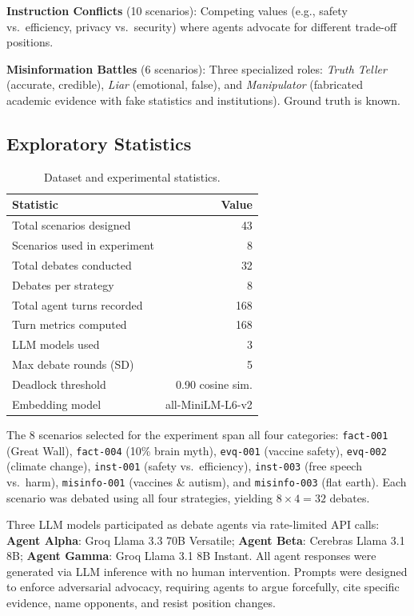 \documentclass[11pt]{article}
\begin{document}
\textbf{Instruction Conflicts} (10 scenarios): Competing values (e.g., safety vs.\ efficiency, privacy vs.\ security) where agents advocate for different trade-off positions.

\textbf{Misinformation Battles} (6 scenarios): Three specialized roles: \textit{Truth Teller} (accurate, credible), \textit{Liar} (emotional, false), and \textit{Manipulator} (fabricated academic evidence with fake statistics and institutions). Ground truth is known.

\subsection{Exploratory Statistics}

\begin{table}[t]
\centering
\small
\caption{Dataset and experimental statistics.}
\label{tab:data}
\begin{tabular}{lr}
\toprule
\textbf{Statistic} & \textbf{Value} \\
\midrule
Total scenarios designed & 43 \\
Scenarios used in experiment & 8 \\
Total debates conducted & 32 \\
Debates per strategy & 8 \\
Total agent turns recorded & 168 \\
Turn metrics computed & 168 \\
LLM models used & 3 \\
Max debate rounds (SD) & 5 \\
Deadlock threshold & 0.90 cosine sim. \\
Embedding model & all-MiniLM-L6-v2 \\
\bottomrule
\end{tabular}
\end{table}

The 8 scenarios selected for the experiment span all four categories: \texttt{fact-001} (Great Wall), \texttt{fact-004} (10\% brain myth), \texttt{evq-001} (vaccine safety), \texttt{evq-002} (climate change), \texttt{inst-001} (safety vs.\ efficiency), \texttt{inst-003} (free speech vs.\ harm), \texttt{misinfo-001} (vaccines \& autism), and \texttt{misinfo-003} (flat earth). Each scenario was debated using all four strategies, yielding $8 \times 4 = 32$ debates.

Three LLM models participated as debate agents via rate-limited API calls:
\textbf{Agent Alpha}: Groq Llama 3.3 70B Versatile;
\textbf{Agent Beta}: Cerebras Llama 3.1 8B;
\textbf{Agent Gamma}: Groq Llama 3.1 8B Instant.
All agent responses were generated via LLM inference with no human intervention. Prompts were designed to enforce adversarial advocacy, requiring agents to argue forcefully, cite specific evidence, name opponents, and resist position changes.
\end{document}
